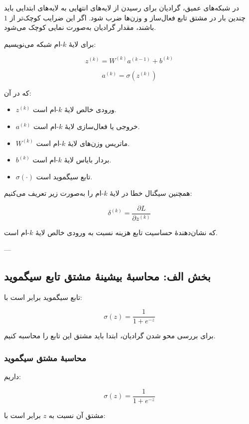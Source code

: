 \documentclass[12pt,a4paper]{article}
\begin{document}
\begin{tcolorbox}[
	colback=lightblue,
	colframe=mainblue,
	title=ایدهٔ اصلی سوال
	]
	در شبکه‌های عمیق، گرادیان برای رسیدن از لایه‌های انتهایی به لایه‌های ابتدایی باید چندین بار در مشتق تابع فعال‌ساز و وزن‌ها ضرب شود. اگر این ضرایب کوچک‌تر از \(1\) باشند، مقدار گرادیان به‌صورت نمایی کوچک می‌شود.
\end{tcolorbox}

برای لایهٔ \(k\)-ام شبکه می‌نویسیم:

\[
z^{(k)} = W^{(k)}a^{(k-1)} + b^{(k)}
\]

\[
a^{(k)} = \sigma(z^{(k)})
\]

که در آن:

\begin{itemize}
	\item \(z^{(k)}\) ورودی خالص لایهٔ \(k\)-ام است.
	\item \(a^{(k)}\) خروجی یا فعال‌سازی لایهٔ \(k\)-ام است.
	\item \(W^{(k)}\) ماتریس وزن‌های لایهٔ \(k\)-ام است.
	\item \(b^{(k)}\) بردار بایاس لایهٔ \(k\)-ام است.
	\item \(\sigma(\cdot)\) تابع سیگموید است.
\end{itemize}

همچنین سیگنال خطا در لایهٔ \(k\)-ام را به‌صورت زیر تعریف می‌کنیم:

\[
\delta^{(k)} = \frac{\partial L}{\partial z^{(k)}}
\]

که نشان‌دهندهٔ حساسیت تابع هزینه نسبت به ورودی خالص لایهٔ \(k\)-ام است.

---

\subsection{بخش الف: محاسبهٔ بیشینهٔ مشتق تابع سیگموید}

تابع سیگموید برابر است با:

\[
\sigma(z)=\frac{1}{1+e^{-z}}
\]

برای بررسی محو شدن گرادیان، ابتدا باید مشتق این تابع را محاسبه کنیم.

\subsubsection{محاسبهٔ مشتق سیگموید}

داریم:

\[
\sigma(z)=\frac{1}{1+e^{-z}}
\]

مشتق آن نسبت به \(z\) برابر است با:
\end{document}
